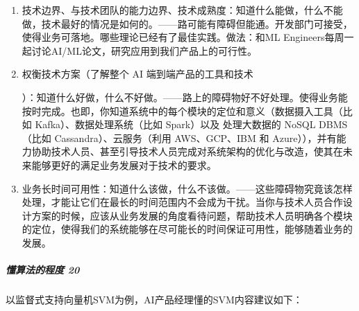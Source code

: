 \documentclass[letterpaper,10pt,english]{sphinxmanual}
\begin{document}
\begin{enumerate}
\item {} 
技术边界、与技术团队的能力边界、技术成熟度：知道什么能做，什么不能做，技术最好的情况是如何的。——路可能有障碍但能通。开发部门可接受，使得业务可落地。哪些理论已经有了最佳实践。做法：和ML
Engineers每周一起讨论AI/ML论文，研究应用到我们产品上的可行性。%
\begin{footnote}[433]\sphinxAtStartFootnote
{}
%
\end{footnote}

\item {} 
权衡技术方案（了解整个 AI
端到端产品的工具和技术%
\begin{footnote}[434]\sphinxAtStartFootnote
{}
%
\end{footnote}）：知道什么好做，什么不好做。——路上的障碍物好不好处理。使得业务能按时完成。也即，你知道系统中的每个模块的定位和意义（数据摄入工具（比如
Kafka）、数据处理系统（比如 Spark）以及 处理大数据的 NoSQL DBMS（比如
Cassandra）、云服务（利用 AWS、GCP、IBM 和
Azure）），并有能力协助技术人员、甚至引导技术人员完成对系统架构的优化与改造，使其在未来能够更好的满足业务发展对于技术的要求。

\item {} 
业务长时间可用性：知道什么该做，什么不该做。——这些障碍物究竟该怎样处理，才能让它们在最长的时间范围内不会成为干扰。当你与技术人员合作设计方案的时候，应该从业务发展的角度看待问题，帮助技术人员明确各个模块的定位，使得我们的系统能够在尽可能长的时间保证可用性，能够随着业务的发展。

\end{enumerate}


\subparagraph{懂算法的程度 20\sphinxfootnotemark[435]}
\label{\detokenize{chapter_idea/understand_tech:id5}}%
\begin{footnotetext}[435]\sphinxAtStartFootnote
{}
%
\end{footnotetext}\ignorespaces 
以监督式支持向量机SVM为例，AI产品经理懂的SVM内容建议如下：

\end{document}
